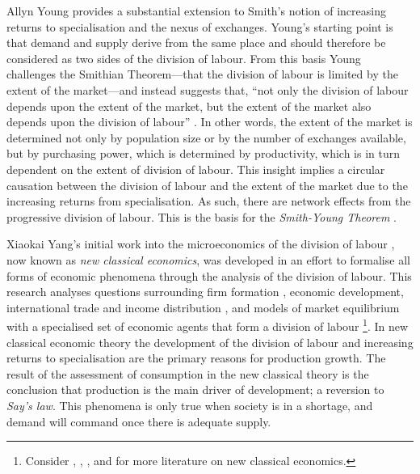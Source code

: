 Allyn Young provides a substantial extension to Smith's notion of increasing returns to specialisation and the nexus of exchanges. Young's starting point is that demand and supply derive from the same place and should therefore be considered as two sides of the division of labour. From this basis Young challenges the Smithian Theorem---that the division of labour is limited by the extent of the market---and instead suggests that, ``not only the division of labour depends upon the extent of the market, but the extent of the market also depends upon the division of labour'' \citep[p.~539]{Young1928}. In other words, the extent of the market is determined not only by population size or by the number of exchanges available, but by purchasing power, which is determined by productivity, which is in turn dependent on the extent of division of labour. This insight implies a circular causation between the division of labour and the extent of the market due to the increasing returns from specialisation. As such, there are network effects from the progressive division of labour. This is the basis for the \textit{Smith-Young Theorem} \citep{Yang2001}.

Xiaokai Yang's initial work into the microeconomics of the division of labour \citep{Yang1988}, now known as \emph{new classical economics}, was developed in an effort to formalise all forms of economic phenomena through the analysis of the division of labour. This research analyses questions surrounding firm formation \citep{YangNg1995, Yang2000}, economic development, international trade and income distribution \citep{YangZhang2003}, and models of market equilibrium with a specialised set of economic agents that form a division of labour \citep{Yao2002, SunYangZhou2004, YangYao2005} \footnote{Consider \citet{YangNg1993}, \citet{YangChengShi2005}, \citet{TombazosYang2006}, and \citet{YangLiu2008} for more literature on new classical economics.}. In new classical economic theory the development of the division of labour and increasing returns to specialisation are the primary reasons for production growth. The result of the assessment of consumption in the new classical theory is the conclusion that production is the main driver of development; a reversion to \emph{Say's law}. This phenomena is only true when society is in a shortage, and demand will command once there is adequate supply.


